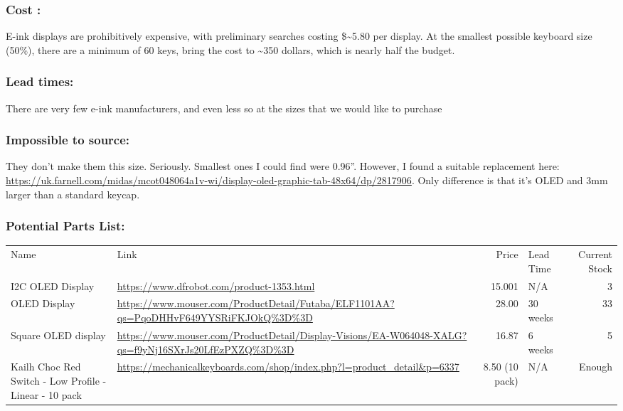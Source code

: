 \documentclass[11pt]{article}
\begin{document}
\subsubsection{Cost :}
\label{sec:org1daecf3}
E-ink displays are prohibitively expensive, with preliminary searches costing \$\textasciitilde{}5.80 per display. At the smallest possible keyboard size (50\%), there are a minimum of 60 keys, bring the cost to \textasciitilde{}350 dollars, which is nearly half the budget.
\subsubsection{Lead times:}
\label{sec:orge00c825}
There are very few e-ink manufacturers, and even less so at the sizes that we would like to purchase
\subsubsection{Impossible to source:}
\label{sec:orgd0ad300}
They don’t make them this size. Seriously.  Smallest ones I could find were 0.96”.  However, I found a suitable replacement here: \url{https://uk.farnell.com/midas/mcot048064a1v-wi/display-oled-graphic-tab-48x64/dp/2817906}.  Only difference is that it’s OLED and 3mm larger than a standard keycap.

\subsubsection{Potential Parts List:}
\label{sec:org8546c70}
\begin{center}
\begin{tabular}{llrlr}
Name & Link & Price & Lead Time & Current Stock\\
I2C OLED Display & \url{https://www.dfrobot.com/product-1353.html} & 15.001 & N/A & 3\\
OLED Display & \url{https://www.mouser.com/ProductDetail/Futaba/ELF1101AA?qs=PqoDHHvF649YYSRiFKJOkQ\%3D\%3D} & 28.00 & 30 weeks & 33\\
Square OLED display & \url{https://www.mouser.com/ProductDetail/Display-Visions/EA-W064048-XALG?qs=f9yNj16SXrJs20LfEzPXZQ\%3D\%3D} & 16.87 & 6 weeks & 5\\
Kailh Choc Red Switch - Low Profile - Linear - 10 pack & \url{https://mechanicalkeyboards.com/shop/index.php?l=product\_detail\&p=6337} & 8.50 (10 pack) & N/A & Enough\\
\end{tabular}
\end{center}
\end{document}
